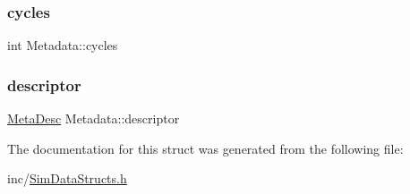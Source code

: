 \subsubsection{\texorpdfstring{cycles}{cycles}}
{\footnotesize\ttfamily int Metadata\+::cycles}

\hypertarget{struct_metadata_a804975d4ed7c782df03c2f3bc55901f3}{}\label{struct_metadata_a804975d4ed7c782df03c2f3bc55901f3} 
\subsubsection{\texorpdfstring{descriptor}{descriptor}}
{\footnotesize\ttfamily \hyperlink{_sim_data_structs_8h_abb2b49b699fce2da44bb66f1b315b6d6}{Meta\+Desc} Metadata\+::descriptor}



The documentation for this struct was generated from the following file\+:\begin{DoxyCompactItemize}
\item 
inc/\hyperlink{_sim_data_structs_8h}{Sim\+Data\+Structs.\+h}\end{DoxyCompactItemize}
